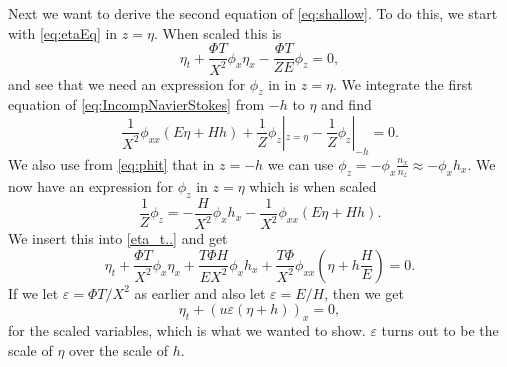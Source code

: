 \documentclass[11pt]{article}
\begin{document}
Next we want to derive the second equation of \eqref{eq:shallow}. To do this, we start with \eqref{eq:etaEq} in $z = \eta$. When scaled this is 
\begin{equation}
    \label{eta_t..}
    \eta_t + \frac{\Phi T}{X^2}\phi_x\eta_x - \frac{\Phi T}{ZE}\phi_z = 0,
\end{equation}
and see that we need an expression for $\phi_z$ in in $z = \eta$. We integrate the first equation of \eqref{eq:IncompNavierStokes} from $-h$ to $\eta$ and find 
\begin{equation*}    
    \frac{1}{X^2}\phi_{xx}(E\eta + Hh) + \frac{1}{Z}\phi_z|_{z=\eta} - \frac{1}{Z}\phi_z|_{-h} = 0.
\end{equation*}
We also use from \eqref{eq:phit} that in $z = -h$ we can use $\phi_z = -\phi_x\frac{n_x}{n_z} \approx -\phi_x h_x$. We now have an expression for $\phi_z$ in $z = \eta$ which is when scaled
\begin{equation*}
    \frac{1}{Z}\phi_z = - \frac{H}{X^2}\phi_x h_x - \frac{1}{X^2}\phi_{xx}(E\eta + Hh).
\end{equation*}
We insert this into \eqref{eta_t..} and get
\begin{equation*} 
    \eta_t + \frac{\Phi T}{X^2}\phi_x\eta_x + \frac{T\Phi H}{EX^2}\phi_x h_x + \frac{T\Phi}{X^2}\phi_{xx}(\eta + h\frac{H}{E}) = 0.
\end{equation*}
If we let $\varepsilon = \Phi T/X^2 $ as earlier and also let $\varepsilon = E/H$, then we get
\begin{equation*}
    \eta_t + (u\varepsilon(\eta + h))_x = 0,
\end{equation*}
for the scaled variables, which is what we wanted to show. $\varepsilon$ turns out to be the scale of $\eta$ over the scale of $h$.
%
%
\end{document}
